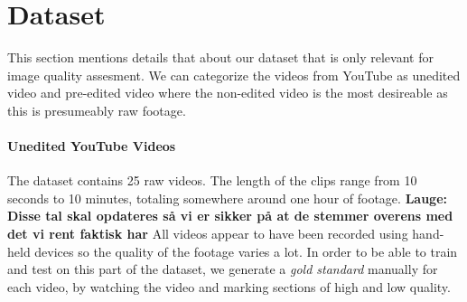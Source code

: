 \section{Dataset}
%
This section mentions details that about our dataset that is only relevant for image quality assesment. We can categorize the videos from YouTube as unedited video and pre-edited video where the non-edited video is the most desireable as this is presumeably raw footage.
%
\paragraph{Unedited YouTube Videos}
%
The dataset contains 25 raw videos. The length of the clips range from 10 seconds to 10 minutes, totaling somewhere around one hour of footage. \textbf{Lauge: Disse tal skal opdateres så vi er sikker på at de stemmer overens med det vi rent faktisk har}
All videos appear to have been recorded using hand-held devices so the quality of the footage varies a lot. In order to be able to train and test on this part of the dataset, we generate a \textit{gold standard} manually for each video, by watching the video and marking sections of high and low quality. %
%

